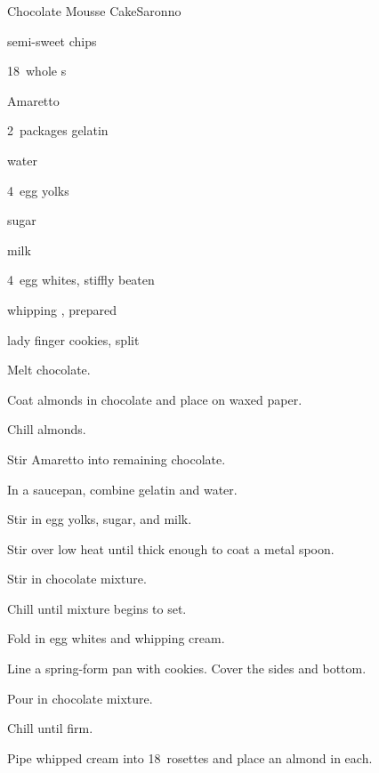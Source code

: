 \begin{recipe}{Chocolate Mousse Cake}{Saronno}{}

\begin{ingredients}
\item {} semi-sweet  chips
\item 18~whole s
\item \C{\half} Amaretto
\item 2~packages gelatin
\item \C{\quarter} water
\item 4~egg yolks
\item \C{\third} sugar
\item {} milk
\item 4~egg whites, stiffly beaten
\item {} whipping , prepared
\item {} lady finger cookies, split
\end{ingredients}

\begin{directions}
\item Melt chocolate.
\item Coat almonds in chocolate and place on waxed paper.
\item Chill almonds.
\item Stir Amaretto into remaining chocolate.
\item In a saucepan, combine gelatin and water.
\item Stir in egg yolks, sugar, and milk.
\item Stir over low heat until thick enough to coat a metal spoon.
\item Stir in chocolate mixture.
\item Chill until mixture begins to set.
\item Fold in egg whites and whipping cream.
\item Line a  spring-form pan with cookies. Cover the sides and bottom.
\item Pour in chocolate mixture.
\item Chill until firm.
\item Pipe whipped cream into 18~rosettes and place an almond in each.
\end{directions}

\end{recipe}
